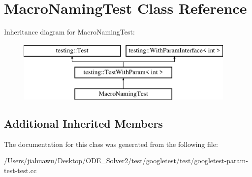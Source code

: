 \hypertarget{class_macro_naming_test}{}\section{Macro\+Naming\+Test Class Reference}
\label{class_macro_naming_test}
Inheritance diagram for Macro\+Naming\+Test\+:\begin{figure}[H]
\begin{center}
\leavevmode
\includegraphics[height=3.000000cm]{class_macro_naming_test}
\end{center}
\end{figure}
\subsection*{Additional Inherited Members}


The documentation for this class was generated from the following file\+:\begin{DoxyCompactItemize}
\item 
/\+Users/jiahuawu/\+Desktop/\+O\+D\+E\+\_\+\+Solver2/test/googletest/test/googletest-\/param-\/test-\/test.\+cc\end{DoxyCompactItemize}
